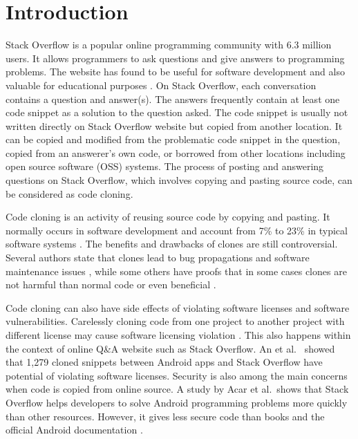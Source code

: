 \documentclass{sig-alternate-05-2015}
\begin{document}
\section{Introduction}
Stack Overflow is a popular online programming community with 6.3 million users. It allows programmers to ask questions and give answers to programming problems. The website has found to be useful for software development \cite{Ponzanelli2013,Ponzanelli2014,Diamantopoulos2015,Keivanloo2014,Park2014, Stolee2014,Subramanian2013,Diamantopoulos2015,Treude2016} and also valuable for educational purposes \cite{Nasehi2012}. On Stack Overflow, each conversation contains a question and answer(s).  The answers frequently contain at least one code snippet as a solution to the question asked. The code snippet is usually not written directly on Stack Overflow website but copied from another location. It can be copied and modified from the problematic code snippet in the question, copied from an answerer's own code, or borrowed from other locations including open source software (OSS) systems. The process of posting and answering questions on Stack Overflow, which involves copying and pasting source code, can be considered as code cloning. 

Code cloning is an activity of reusing source code by copying and pasting. It normally occurs in software development and account from 7\% to 23\% in typical software systems \cite{Bellon2007}. The benefits and drawbacks of clones are still controversial. Several authors state that clones lead to bug propagations and software maintenance issues \cite{Kamiya2002}, while some others have proofs that in some cases clones are not harmful than normal code or even beneficial \cite{Saini2016,Kapser2006}. 

Code cloning can also have side effects of violating software licenses and software vulnerabilities. Carelessly cloning code from one project to another project with different license may cause software licensing violation \cite{German2009}. This also happens within the context of online Q\&A website such as Stack Overflow. An et al.~\cite{An2017} showed that 1,279 cloned snippets between Android apps and Stack Overflow have potential of violating software licenses. Security is also among the main concerns when code is copied from online source. A study by Acar et al.~shows that Stack Overflow helps developers to solve Android programming problems more quickly than other resources. However, it gives less secure code than books and the official Android documentation \cite{Acar2016}.
\end{document}
